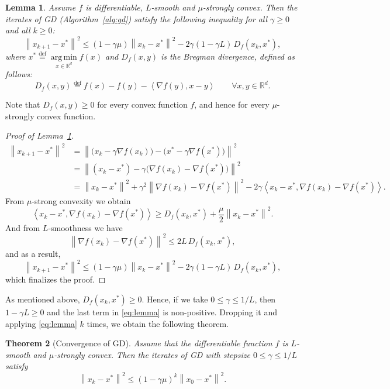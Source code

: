 \documentclass[11pt]{article}
\newtheorem{theorem}{Theorem}
\newtheorem{lemma}[theorem]{Lemma}
\newcommand{\R}{\mathbb{R}}
\newcommand{\norm}[1]{\left\| #1 \right\|}
\newcommand{\inner}[2]{\left\langle #1, #2 \right\rangle}
\DeclareMathOperator*{\argmin}{arg\,min}
\begin{document}
\begin{lemma}\label{lem:one-step}
Assume $f$ is differentiable, $L$-smooth and $\mu$-strongly convex. Then the iterates of GD (Algorithm~\ref{alg:gd}) satisfy
the following inequality for all $\gamma \geq 0$ and all $k \geq 0$:
\begin{equation}\label{eq:lemma}
\norm{x_{k+1}-x^*}^2 \leq (1-\gamma\mu)\norm{x_k-x^*}^2 - 2\gamma (1 - \gamma L)\, D_f(x_k, x^*),
\end{equation}
where $x^* \overset{\text{def}}{=} \argmin\limits_{x\in\R^d} f(x)$ and $D_f(x,y)$ is the Bregman
divergence, defined as follows:
\[
D_f(x, y) \overset{\text{def}}{=} f(x) - f(y) - \inner{\nabla f(y)}{x - y}
\qquad \forall x, y \in \R^d.
\]
\end{lemma}

Note that $D_f(x,y) \geq 0$ for every convex function $f$, and hence for every
$\mu$-strongly convex function.

\begin{proof}[Proof of Lemma~\ref{lem:one-step}]
\begin{align*}
\norm{x_{k+1}-x^*}^2
&= \norm{\bigl(x_k - \gamma\nabla f(x_k)\bigr)-\bigl(x^* - \gamma\nabla f(x^*)\bigr)}^2 \\
&= \norm{(x_k - x^*) - \gamma\bigl(\nabla f(x_k) -\nabla f(x^*)\bigr)}^2 \\
&= \norm{x_k - x^*}^2 + \gamma^2\norm{\nabla f(x_k) -\nabla f(x^*)}^2
   - 2\gamma\inner{x_k - x^*}{\nabla f(x_k) -\nabla f(x^*)}.
\end{align*}
From $\mu$-strong convexity we obtain
\[
\inner{x_k - x^*}{\nabla f(x_k) -\nabla f(x^*)} \geq D_f(x_k,x^*) + \frac{\mu}{2}\norm{x_k - x^*}^2.
\]
And from $L$-smoothness we have
\[
\norm{\nabla f(x_k) -\nabla f(x^*)}^2 \leq 2L\, D_f(x_k,x^*),
\]
and as a result,
\[
\norm{x_{k+1}-x^*}^2 \leq (1-\gamma\mu)\norm{x_k-x^*}^2 - 2\gamma (1 - \gamma L)\, D_f(x_k, x^*),
\]
which finalizes the proof.
\end{proof}

As mentioned above, $D_f(x_k, x^*) \geq 0$. Hence, if we take $0 \leq \gamma \leq 1/L$,
then $1 - \gamma L \geq 0$ and the last term in \eqref{eq:lemma} is non-positive.
Dropping it and applying \eqref{eq:lemma} $k$ times, we obtain the following theorem.

\begin{theorem}[Convergence of GD]\label{thm:gd}
Assume that the differentiable function $f$ is $L$-smooth and $\mu$-strongly convex. Then the iterates of GD
with stepsize $0 \leq \gamma \leq 1/L$ satisfy
\begin{equation}\label{eq:gd-rate}
\norm{x_k-x^*}^2 \leq (1-\gamma\mu)^k\norm{x_0-x^*}^2.
\end{equation}
\end{theorem}
\end{document}
